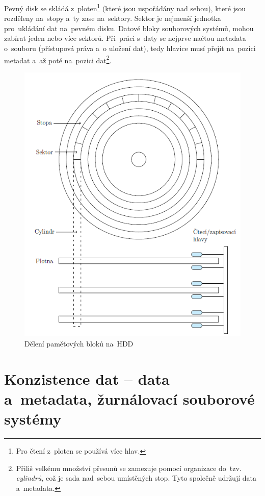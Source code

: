 Pevný disk se skládá z~ploten\footnote{Pro čtení z~ploten se používá více hlav.} (které jsou uspořádány nad sebou), které jsou rozděleny na~stopy a~ty zase na~sektory. Sektor je nejmenší jednotka pro~ukládání dat na~pevném disku. Datové bloky souborových systémů, mohou zabírat jeden nebo více sektorů. Při~práci s~daty se nejprve načtou metadata o~souboru (přístupová práva a~o uložení dat), tedy hlavice musí přejít na~pozici metadat a~až poté na~pozici dat\footnote{Přiliš velkému množství přesunů se zamezuje pomocí organizace do~tzv. \emph{cylindrů}, což je sada nad~sebou umístěných stop. Tyto společně udržují data a~metadata.}.

\begin{figure}[ht]
	\centering
	\includegraphics[scale=1]{images/mem_hdd.png}
	\caption{Dělení paměťových bloků na~HDD}
	\label{mem_hdd}
\end{figure}


\clearpage
\section{Konzistence dat -- data a~metadata, žurnálovací souborové systémy}

